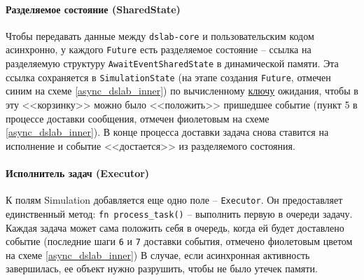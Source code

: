 \paragraph{Разделяемое состояние (SharedState)}
Чтобы передавать данные между \texttt{dslab-core} и пользовательским кодом асинхронно, у каждого \texttt{Future} есть разделяемое состояние -- ссылка на разделяемую структуру \texttt{AwaitEventSharedState} в динамической памяти. Эта ссылка сохраняется в \texttt{SimulationState} (на этапе создания \texttt{Future}, отмечен синим на схеме \ref{async_dslab_inner}) по вычисленному \hyperref[awaitkey]{ключу} ожидания, чтобы в эту <<корзинку>> можно было <<положить>> пришедшее событие (пункт 5 в процессе доставки сообщения, отмечен фиолетовым на схеме \ref{async_dslab_inner}). В конце процесса  доставки задача снова ставится на исполнение и событие <<достается>> из разделяемого состояния. 

\paragraph{Исполнитель задач (Executor)}
К полям Simulation добавляется еще одно поле -- \texttt{Executor}. Он предоставляет единственный метод: \texttt{fn process\_task()} -- выполнить первую в очереди задачу. Каждая задача может сама положить себя в очередь, когда ей будет доставлено событие (последние шаги \texttt{6} и \texttt{7} доставки события, отмечено фиолетовым цветом на схеме \ref{async_dslab_inner}) В случае, если асинхронная активность завершилась, ее объект нужно разрушить, чтобы не было утечек памяти. 

